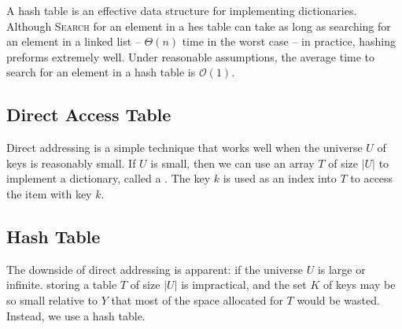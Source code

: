 
A hash table is an effective data structure for implementing dictionaries. Although \textsc{Search} for an element in a hes table can take as long as searching for an element in a linked list -- $\Theta(n)$ time in the worst case -- in practice, hashing preforms extremely well. Under reasonable assumptions, the average time to search for an element in a hash table is $\mathcal{O}(1)$. 

\subsection{Direct Access Table}

Direct addressing is a simple technique that works well when the universe $U$ of keys is reasonably small. If $U$ is small, then we can use an array $T$ of size $|U|$ to implement a dictionary, called a . The key $k$ is used as an index into $T$ to access the item with key $k$.

\subsection{Hash Table}

The downside of direct addressing is apparent: if the universe $U$ is large or infinite. storing a table $T$ of size $|U|$ is impractical, and the set $K$ of keys  may be so small relative to $Y$ that most of the space allocated for $T$ would be wasted. Instead, we use a hash table. 

